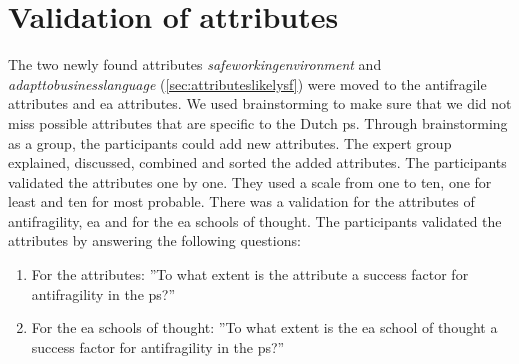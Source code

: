 \section{Validation of attributes}
\label{sec:validationofattributes}
The two newly found attributes \textit{\gls{safeworkingenvironment}} and \textit{\gls{adapttobusinesslanguage}} (\cref{sec:attributeslikelysf}) were moved to the \gls{antifragile} \glspl{attribute} and \gls{ea} \glspl{attribute}. We used brainstorming to make sure that we did not miss possible \glspl{attribute} that are specific to the Dutch \gls{ps}. Through brainstorming as a group, the participants could add new \glspl{attribute}. The expert group explained, discussed, combined and sorted the added \glspl{attribute}. The participants validated the \glspl{attribute} one by one. They used a scale from one to ten, one for least and ten for most probable. There was a validation for the \glspl{attribute} of \gls{antifragility}, \gls{ea} and for the \gls{ea} schools of thought. The participants validated the \glspl{attribute} by answering the following questions:
\begin{enumerate}
	\item{For the \glspl{attribute}: ''To what extent is the \gls{attribute} a success factor for \gls{antifragility} in the \gls{ps}?''}
	\item{For the \gls{ea} schools of thought: ''To what extent is the \gls{ea} school of thought a success factor for \gls{antifragility} in the \gls{ps}?''}
\end{enumerate}
